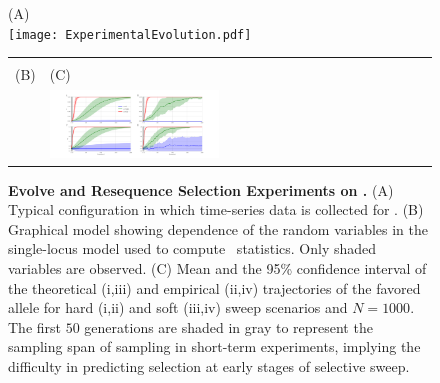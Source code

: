 \begin{figure}[H]
		\centering
(A)\\
	\texttt{[image: ExperimentalEvolution.pdf]}\\

\begin{tabular}{l|l}
		\hline\\
		(B) &(C)\\
		\raisebox{0.1in}{
\texttt{[image: HMMGM.pdf]}}
& 	\includegraphics[trim=0in 0.in 0in 
0.0in,clip,width=0.45\textwidth]{AF.pdf}	

\end{tabular}
\hspace{-1in}
\caption{{\bf Evolve and Resequence Selection Experiments on \dmel.}
  (A) Typical configuration in which time-series data is collected for
  \dmel.  (B) Graphical model showing dependence of the random
  variables in the single-locus model used to compute \comale\
  statistics. Only shaded variables are observed.  (C) Mean and the
  95\% confidence interval of the theoretical (i,iii) and empirical (ii,iv) 
  trajectories of
  the favored allele for hard (i,ii) and soft (iii,iv) sweep scenarios and
  $N=1000$.  The first $50$ generations are shaded in gray to
  represent the sampling span of sampling in short-term experiments,
  implying the difficulty in predicting selection at early stages of
  selective sweep.  }
\label{fig:1}
\end{figure}






